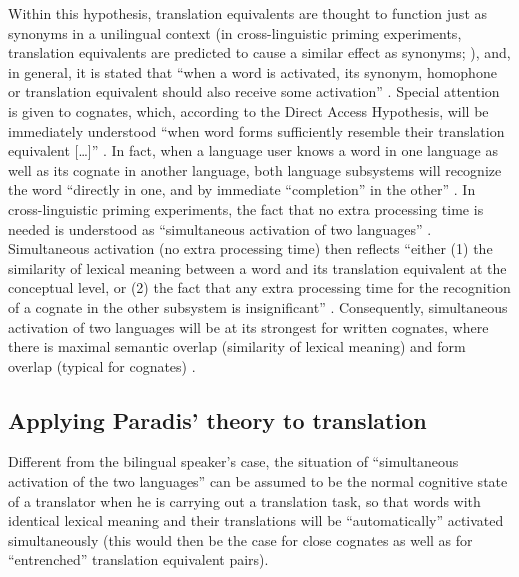 Within this hypothesis, translation equivalents are thought to function just as synonyms in a unilingual context (in cross-linguistic priming experiments, translation equivalents are predicted to cause a similar effect as synonyms; \citealp[219]{paradis_neurolinguistic_2004}), and, in general, it is stated that “when a word is activated, its synonym, homophone or translation equivalent should also receive some activation” \citep[219]{paradis_neurolinguistic_2004}. Special attention is given to cognates, which, according to the Direct Access Hypothesis, will be immediately understood “when word forms sufficiently resemble their translation equivalent […]” \citep[218]{paradis_neurolinguistic_2004}. In fact, when a language user knows a word in one language as well as its cognate in another language, both language subsystems will recognize the word “directly in one, and by immediate “completion” in the other” \citep[218]{paradis_neurolinguistic_2004}. In cross-linguistic priming experiments, the fact that no extra processing time is needed is understood as “simultaneous activation of two languages” \citep[219]{paradis_neurolinguistic_2004}. Simultaneous activation (no extra processing time) then reflects “either (1) the similarity of lexical meaning between a word and its translation equivalent at the conceptual level, or (2) the fact that any extra processing time for the recognition of a cognate in the other subsystem is insignificant” \citep[219]{paradis_neurolinguistic_2004}. Consequently, simultaneous activation of two languages will be at its strongest for written cognates, where there is maximal semantic overlap (similarity of lexical meaning) and form overlap (typical for cognates) \citep[219]{paradis_neurolinguistic_2004}.

\subsection{Applying Paradis’ theory to translation}
\label{sec:5.3.2}  
Different from the bilingual speaker’s case, the situation of “simultaneous activation of the two languages” can be assumed to be the normal cognitive state of a translator when he is carrying out a translation task, so that words with identical lexical meaning and their translations will be ``automatically'' activated simultaneously (this would then be the case for close cognates as well as for ``entrenched'' translation equivalent pairs).


